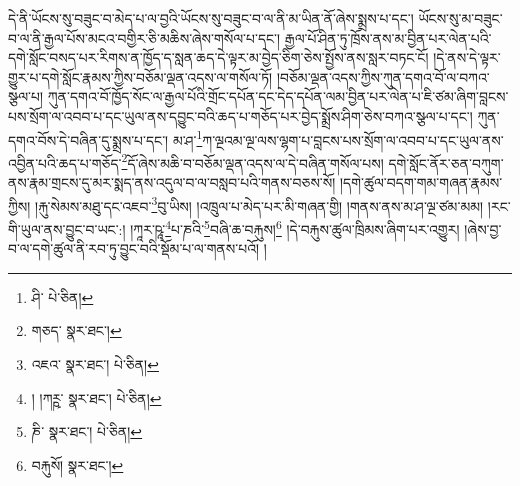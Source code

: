 དེ་ནི་ཡོངས་སུ་བཟུང་བ་མེད་པ་ལ་བྱའི་ཡོངས་སུ་བཟུང་བ་ལ་ནི་མ་ཡིན་ནོ་ཞེས་སྨྲས་པ་དང་། ཡོངས་སུ་མ་བཟུང་བ་ལ་ནི་རྒྱལ་པོས་མངའ་བགྱིར་ཅི་མཆིས་ཞེས་གསོལ་པ་དང་། རྒྱལ་པོ་ཤིན་ཏུ་ཁྲོས་ནས་མ་བྱིན་པར་ལེན་པའི་དགེ་སློང་བསད་པར་རིགས་ན་ཁྱོད་ད་སླན་ཆད་དེ་ལྟར་མ་བྱེད་ཅིག་ཅེས་སྤྱོས་ནས་སླར་བཏང་ངོ། །དེ་ནས་དེ་ལྟར་གྱུར་པ་དགེ་སློང་རྣམས་ཀྱིས་བཅོམ་ལྡན་འདས་ལ་གསོལ་ཏོ། །བཅོམ་ལྡན་འདས་ཀྱིས་ཀུན་དགའ་བོ་ལ་བཀའ་སྩལ་པ། ཀུན་དགའ་བོ་ཁྱོད་སོང་ལ་རྒྱལ་པོའི་གྲོང་དཔོན་དང་དེད་དཔོན་ལམ་བྱིན་པར་ལེན་པ་ཇི་ཙམ་ཞིག་བླངས་པས་སྲོག་ལ་འབབ་པ་དང་ཡུལ་ནས་དབྱུང་བའི་ཆད་པ་གཅོད་པར་བྱེད་སྨྲོས་ཤིག་ཅེས་བཀའ་སྩལ་པ་དང་། ཀུན་དགའ་བོས་དེ་བཞིན་དུ་སྨྲས་པ་དང་། མ་ཤ་\footnote{ཤི་  པེ་ཅིན། }ཀ་ལྔའམ་ལྔ་ལས་ལྷག་པ་བླངས་པས་སྲོག་ལ་འབབ་པ་དང་ཡུལ་ནས་འབྱིན་པའི་ཆད་པ་གཅོད་\footnote{གཅད་  སྣར་ཐང་། }དོ་ཞེས་མཆི་བ་བཅོམ་ལྡན་འདས་ལ་དེ་བཞིན་གསོལ་པས། དགེ་སློང་ནོར་ཅན་བཀུག་ནས་རྣམ་གྲངས་དུ་མར་སྨད་ནས་འདུལ་བ་ལ་བསླབ་པའི་གནས་བཅས་སོ། །དགེ་ཚུལ་བདག་གམ་གཞན་རྣམས་ཀྱིས། །རྐུ་སེམས་མཐུ་དང་འཇབ་\footnote{འཇའ་  སྣར་ཐང་།  པེ་ཅིན། }བུ་ཡིས། །འཁྲུལ་པ་མེད་པར་མི་གཞན་གྱི། །གནས་ནས་མ་ཤ་ལྔ་ཙམ་མམ། །རང་གི་ཡུལ་ནས་བྱུང་བ་ཡང་:། །ཀཱར་ཥཱ་\footnote{། །ཀཪྵ་  སྣར་ཐང་།  པེ་ཅིན། }པ་ཎའི་\footnote{ཎི་  སྣར་ཐང་།  པེ་ཅིན། }བཞི་ཆ་བརྐུས།\footnote{བརྐུསོ།  སྣར་ཐང་། } །དེ་བརྐུས་ཚུལ་ཁྲིམས་ཞིག་པར་འགྱུར། །ཞེས་བྱ་བ་ལ་དགེ་ཚུལ་ནི་རབ་ཏུ་བྱུང་བའི་སྡོམ་པ་ལ་གནས་པའོ། །
